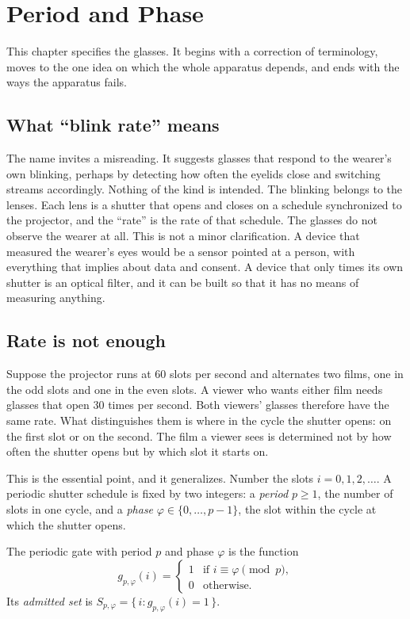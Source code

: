 \chapter{Period and Phase}\label{ch:phase}

This chapter specifies the glasses. It begins with a correction of terminology, moves to the one idea on which the whole apparatus depends, and ends with the ways the apparatus fails.

\section{What ``blink rate'' means}

The name invites a misreading. It suggests glasses that respond to the wearer's own blinking, perhaps by detecting how often the eyelids close and switching streams accordingly. Nothing of the kind is intended. The blinking belongs to the lenses. Each lens is a shutter that opens and closes on a schedule synchronized to the projector, and the ``rate'' is the rate of that schedule. The glasses do not observe the wearer at all. This is not a minor clarification. A device that measured the wearer's eyes would be a sensor pointed at a person, with everything that implies about data and consent. A device that only times its own shutter is an optical filter, and it can be built so that it has no means of measuring anything.

\section{Rate is not enough}

Suppose the projector runs at 60 slots per second and alternates two films, one in the odd slots and one in the even slots. A viewer who wants either film needs glasses that open 30 times per second. Both viewers' glasses therefore have the same rate. What distinguishes them is where in the cycle the shutter opens: on the first slot or on the second. The film a viewer sees is determined not by how often the shutter opens but by which slot it starts on.

This is the essential point, and it generalizes. Number the slots $i=0,1,2,\ldots$. A periodic shutter schedule is fixed by two integers: a \emph{period} $p\ge 1$, the number of slots in one cycle, and a \emph{phase} $\varphi\in\{0,\ldots,p-1\}$, the slot within the cycle at which the shutter opens.

\begin{definition}
The periodic gate with period $p$ and phase $\varphi$ is the function
\begin{equation}
g_{p,\varphi}(i)=
\begin{cases}
1 & \text{if } i\equiv\varphi \pmod p,\\
0 & \text{otherwise.}
\end{cases}
\end{equation}
Its \emph{admitted set} is $S_{p,\varphi}=\{\,i: g_{p,\varphi}(i)=1\,\}$.
\end{definition}

